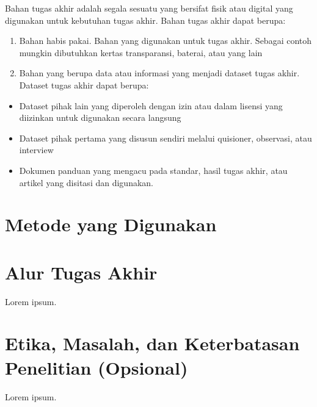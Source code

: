 Bahan tugas akhir adalah segala sesuatu yang bersifat fisik atau digital yang digunakan untuk kebutuhan tugas akhir. Bahan tugas akhir dapat berupa:

\begin{enumerate}
	\item Bahan habis pakai. Bahan yang digunakan untuk tugas akhir. Sebagai contoh 
	mungkin dibutuhkan kertas transparansi, baterai, atau yang lain 
	\item Bahan yang berupa data atau informasi yang menjadi dataset tugas akhir. Dataset tugas akhir dapat berupa:
\end{enumerate}
\begin{itemize}
	\item Dataset pihak lain yang diperoleh dengan izin atau dalam lisensi yang diizinkan untuk digunakan secara langsung 
	\item Dataset pihak pertama yang disusun sendiri melalui quisioner, observasi, atau interview 
	\item Dokumen panduan yang mengacu pada standar, hasil tugas akhir, atau artikel yang disitasi dan digunakan.
\end{itemize}


\section{Metode yang Digunakan}




\section{Alur Tugas Akhir}

Lorem ipsum.

\section{Etika, Masalah, dan Keterbatasan Penelitian (Opsional)}

Lorem ipsum.
